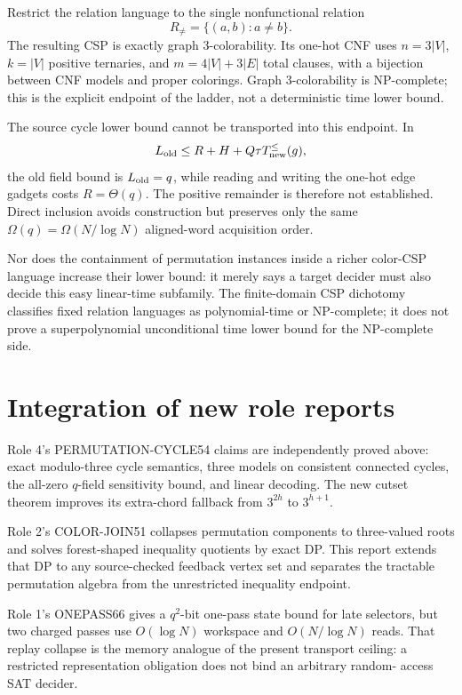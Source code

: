 \documentclass[11pt]{article}
\begin{document}
Restrict the relation language to the single nonfunctional relation
\[
R_{\ne}=\{(a,b):a\ne b\}.
\]
The resulting CSP is exactly graph 3-colorability.  Its one-hot CNF uses
$n=3|V|$, $k=|V|$ positive ternaries, and
$m=4|V|+3|E|$ total clauses, with a bijection between CNF models and proper
colorings.  Graph 3-colorability is NP-complete; this is the explicit endpoint
of the ladder, not a deterministic time lower bound.

The source cycle lower bound cannot be transported into this endpoint.  In
\[
L_{\rm old}\le R+H+Q\tau T_{\rm new}^{\le}(g),
\]
the old field bound is $L_{\rm old}=q$, while reading and writing the one-hot
edge gadgets costs $R=\Theta(q)$.  The positive remainder is therefore not
established.  Direct inclusion avoids construction but preserves only the
same $\Omega(q)=\Omega(N/\log N)$ aligned-word acquisition order.

Nor does the containment of permutation instances inside a richer color-CSP
language increase their lower bound: it merely says a target decider must
also decide this easy linear-time subfamily.  The finite-domain CSP dichotomy
classifies fixed relation languages as polynomial-time or NP-complete; it
does not prove a superpolynomial unconditional time lower bound for the
NP-complete side.

\section{Integration of new role reports}

Role 4's PERMUTATION-CYCLE54 claims are independently proved above: exact
modulo-three cycle semantics, three models on consistent connected cycles,
the all-zero $q$-field sensitivity bound, and linear decoding.  The new
cutset theorem improves its extra-chord fallback from $3^{2h}$ to
$3^{h+1}$.

Role 2's COLOR-JOIN51 collapses permutation components to three-valued roots
and solves forest-shaped inequality quotients by exact DP.  This report
extends that DP to any source-checked feedback vertex set and separates the
tractable permutation algebra from the unrestricted inequality endpoint.

Role 1's ONEPASS66 gives a $q^2$-bit one-pass state bound for late selectors,
but two charged passes use $O(\log N)$ workspace and $O(N/\log N)$ reads.
That replay collapse is the memory analogue of the present transport ceiling:
a restricted representation obligation does not bind an arbitrary random-
access SAT decider.
\end{document}
